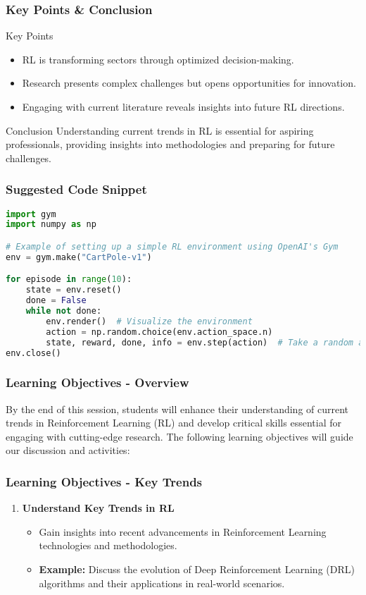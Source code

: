 \documentclass{beamer}
\begin{document}
\begin{frame}[fragile]
    \frametitle{Key Points & Conclusion}
    \begin{block}{Key Points}
        \begin{itemize}
            \item RL is transforming sectors through optimized decision-making.
            \item Research presents complex challenges but opens opportunities for innovation.
            \item Engaging with current literature reveals insights into future RL directions.
        \end{itemize}
    \end{block}
    
    \begin{block}{Conclusion}
        Understanding current trends in RL is essential for aspiring professionals, providing insights into methodologies and preparing for future challenges.
    \end{block}
\end{frame}

\begin{frame}[fragile]
    \frametitle{Suggested Code Snippet}
    \begin{lstlisting}[language=Python]
import gym
import numpy as np

# Example of setting up a simple RL environment using OpenAI's Gym
env = gym.make("CartPole-v1")

for episode in range(10):
    state = env.reset()
    done = False
    while not done:
        env.render()  # Visualize the environment
        action = np.random.choice(env.action_space.n)
        state, reward, done, info = env.step(action)  # Take a random action
env.close()
    \end{lstlisting}
\end{frame}

\begin{frame}[fragile]
    \frametitle{Learning Objectives - Overview}
    By the end of this session, students will enhance their understanding of current trends in Reinforcement Learning (RL) and develop critical skills essential for engaging with cutting-edge research. The following learning objectives will guide our discussion and activities:
\end{frame}

\begin{frame}[fragile]
    \frametitle{Learning Objectives - Key Trends}
    \begin{enumerate}
        \item \textbf{Understand Key Trends in RL}
        \begin{itemize}
            \item Gain insights into recent advancements in Reinforcement Learning technologies and methodologies.
            \item \textbf{Example:} Discuss the evolution of Deep Reinforcement Learning (DRL) algorithms and their applications in real-world scenarios.
        \end{itemize}
    \end{enumerate}
\end{frame}
\end{document}
